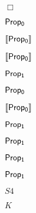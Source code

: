 \documentclass[10pt]{book}
\begin{document}
\begin{mdSnippets}
\begin{mdInlineSnippet}[c3880bc63c2b0fd10cdc024cf76a1924]%
$\Box$\end{mdInlineSnippet}%
\begin{mdInlineSnippet}[c09859c00da566980873081e8d77a317]%
${\sf Prop_0}$\end{mdInlineSnippet}%
\begin{mdInlineSnippet}[6abfdac12c5881728b0774166e4c6328]%
$\llbracket{\sf Prop_0}\rrbracket$\end{mdInlineSnippet}%
\begin{mdInlineSnippet}[6abfdac12c5881728b0774166e4c6328]%
$\llbracket{\sf Prop_0}\rrbracket$\end{mdInlineSnippet}%
\begin{mdInlineSnippet}[1adbe235087fa8958bc806a79b07b5cf]%
${\sf Prop_1}$\end{mdInlineSnippet}%
\begin{mdInlineSnippet}[c09859c00da566980873081e8d77a317]%
${\sf Prop_0}$\end{mdInlineSnippet}%
\begin{mdInlineSnippet}[56411dab26c385df0e07a31c05a57b4e]%
${\sf \llbracket Prop_0 \rrbracket}$\end{mdInlineSnippet}%
\begin{mdInlineSnippet}%
${\sf  Prop_1 }$\end{mdInlineSnippet}%
\begin{mdInlineSnippet}%
${\sf  Prop_1 }$\end{mdInlineSnippet}%
\begin{mdInlineSnippet}%
${\sf  Prop_1 }$\end{mdInlineSnippet}%
\begin{mdInlineSnippet}%
${\sf  Prop_1 }$\end{mdInlineSnippet}%
\begin{mdInlineSnippet}%
$S4$\end{mdInlineSnippet}%
\begin{mdInlineSnippet}[a5f3c6a11b03839d46af9fb43c97c188]%
$K$\end{mdInlineSnippet}%
\begin{mdInlineSnippet}%

\end{mdInlineSnippet}
\end{mdSnippets}
\end{document}
